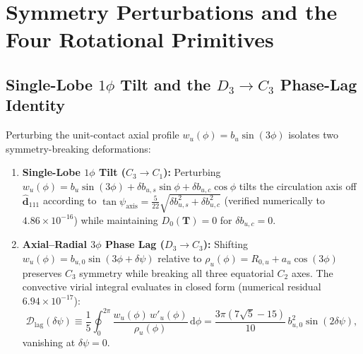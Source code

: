 \documentclass[11pt, a4paper]{article}
\DeclareRobustCommand{\dd}{\mathrm{d}}
\begin{document}
\section{Symmetry Perturbations and the Four Rotational Primitives}
\label{sec:sym_breaking}

\subsection{\texorpdfstring{Single-Lobe $1\phi$ Tilt and the $D_3 \to C_3$ Phase-Lag Identity}{Single-Lobe 1-Phi Tilt and the D3 to C3 Phase-Lag Identity}}
Perturbing the unit-contact axial profile $w_u(\phi) = b_u\sin(3\phi)$ isolates two symmetry-breaking deformations:
\begin{enumerate}[leftmargin=1.8em, itemsep=2pt]
    \item \textbf{Single-Lobe $1\phi$ Tilt ($C_3 \to C_1$):} Perturbing $w_u(\phi) = b_u\sin(3\phi) + \delta b_{u,s}\sin\phi + \delta b_{u,c}\cos\phi$ tilts the circulation axis off $\hat{\mathbf{d}}_{111}$ according to $\tan\psi_{\mathrm{axis}} = \frac{5}{22}\sqrt{\delta b_{u,s}^2 + \delta b_{u,c}^2}$ (verified numerically to $4.86 \times 10^{-16}$) while maintaining $D_0(\mathbf{T}) = 0$ for $\delta b_{u,c} = 0$.
    \item \textbf{Axial--Radial $3\phi$ Phase Lag ($D_3 \to C_3$):} Shifting $w_u(\phi) = b_{u,0}\sin(3\phi + \delta\psi)$ relative to $\rho_u(\phi) = R_{0,u} + a_u\cos(3\phi)$ preserves $C_3$ symmetry while breaking all three equatorial $C_2$ axes. The convective virial integral evaluates in closed form (numerical residual $6.94 \times 10^{-17}$):
    \begin{equation}
        \mathcal{D}_{\mathrm{lag}}(\delta\psi) \equiv \frac{1}{5}\oint_0^{2\pi} \frac{w_u(\phi)\,w'_u(\phi)}{\rho_u(\phi)}\,\dd\phi = \frac{3\pi(7\sqrt{5} - 15)}{10}\,b_{u,0}^2\sin(2\delta\psi),
        \label{eq:phase_lag_virial}
    \end{equation}
    vanishing at $\delta\psi = 0$.
\end{enumerate}
\end{document}

